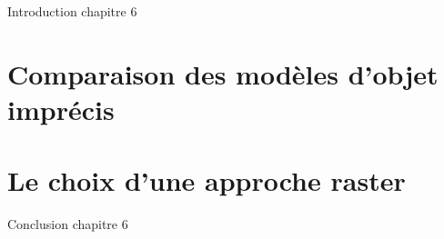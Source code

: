 %

\chaptertoc{}


Introduction chapitre 6

\section{Comparaison des modèles d'objet imprécis}

\section{Le choix d'une approche raster}


Conclusion chapitre 6

